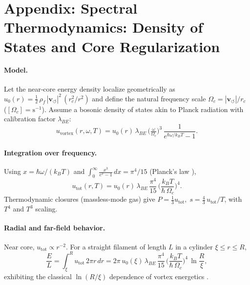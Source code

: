\documentclass[10pt,reprint,aps,onecolumn,nofootinbib]{revtex4-2}
\begin{document}
\section{Appendix: Spectral Thermodynamics: Density of States and Core Regularization}
\label{app:vortex-spectral-thermo}

    \paragraph{Model.}
        Let the near‐core energy density localize geometrically as
        \(u_0(r)=\tfrac12\,\rho_{\!f}\,|\mathbf{v}_{\!\boldsymbol{\circlearrowleft}}|^{2}\,(r_c^{2}/r^{2})\)
        and define the natural frequency scale \(\Omega_c=|\mathbf{v}_{\!\boldsymbol{\circlearrowleft}}|/r_c\)
        (\([\Omega_c]=\mathrm{s^{-1}}\)).
        Assume a bosonic density of states akin to Planck radiation with calibration factor \(\lambda_{\!BE}\):
        \begin{equation}
        u_{\mathrm{vortex}}(r,\omega,T)=u_0(r)\,\lambda_{\!BE}\,
        \Big(\tfrac{\omega}{\Omega_c}\Big)^{3}\,\frac{1}{e^{\hbar\omega/k_B T}-1}.
        \end{equation}

    \paragraph{Integration over frequency.}
        Using \(x=\hbar\omega/(k_B T)\) and
        \(\int_0^\infty \tfrac{x^3}{e^x-1}\,dx=\pi^4/15\) (Planck’s law \cite{Planck1901}),
        \begin{equation}
        u_{\mathrm{tot}}(r,T)
        =u_0(r)\,\lambda_{\!BE}\,\frac{\pi^4}{15}\,
        \Big(\frac{k_B T}{\hbar\,\Omega_c}\Big)^{4}.
        \end{equation}
        Thermodynamic closures (massless‐mode gas) give
        \(
        P=\tfrac13 u_{\mathrm{tot}},\;
        s=\tfrac{4}{3}\,u_{\mathrm{tot}}/T
        \),
        with \(T^4\) and \(T^3\) scaling.

    \paragraph{Radial and far-field behavior.}
        Near core, \(u_{\mathrm{tot}}\propto r^{-2}\).
        For a straight filament of length \(L\) in a cylinder \(\xi\le r\le R\),
        \[
            \frac{E}{L}=\int_\xi^{R}u_{\mathrm{tot}}\,2\pi r\,dr
            =2\pi\,u_0(\xi)\,\lambda_{\!BE}\,\frac{\pi^4}{15}\,
            \Big(\frac{k_B T}{\hbar\,\Omega_c}\Big)^{4}\,\ln\!\frac{R}{\xi},
        \]
        exhibiting the classical \(\ln(R/\xi)\) dependence of vortex energetics
        \cite{Saffman1992,Batchelor1967,LandauFM}.
\end{document}

